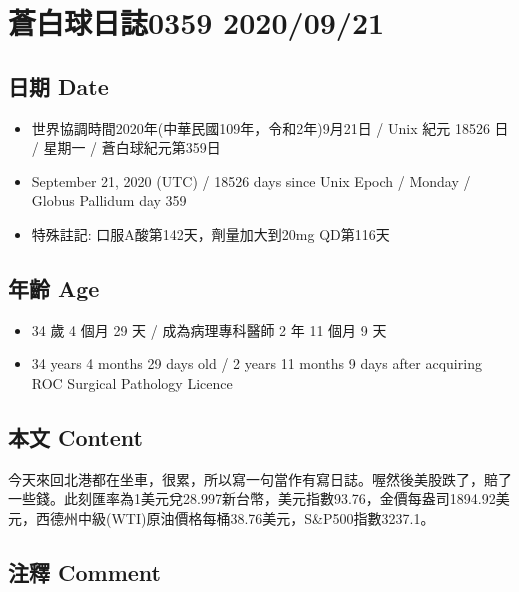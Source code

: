 \documentclass[a5paper, 11pt
]{book}
\providecommand{\tightlist}{%
  \setlength{\itemsep}{0pt}\setlength{\parskip}{0pt}}
\begin{document}
\hypertarget{ux84bcux767dux7403ux65e5ux8a8c0359-20200921}{%
\section{蒼白球日誌0359
2020/09/21}\label{ux84bcux767dux7403ux65e5ux8a8c0359-20200921}}

\hypertarget{ux65e5ux671f-date-20}{%
\subsection{日期 Date}\label{ux65e5ux671f-date-20}}

\begin{itemize}
\tightlist
\item
  世界協調時間2020年(中華民國109年，令和2年)9月21日 / Unix 紀元 18526 日
  / 星期一 / 蒼白球紀元第359日
\item
  September 21, 2020 (UTC) / 18526 days since Unix Epoch / Monday /
  Globus Pallidum day 359
\item
  特殊註記: 口服A酸第142天，劑量加大到20mg QD第116天
\end{itemize}

\hypertarget{ux5e74ux9f61-age-20}{%
\subsection{年齡 Age}\label{ux5e74ux9f61-age-20}}

\begin{itemize}
\tightlist
\item
  34 歲 4 個月 29 天 / 成為病理專科醫師 2 年 11 個月 9 天
\item
  34 years 4 months 29 days old / 2 years 11 months 9 days after
  acquiring ROC Surgical Pathology Licence
\end{itemize}

\hypertarget{ux672cux6587-content-20}{%
\subsection{本文 Content}\label{ux672cux6587-content-20}}

今天來回北港都在坐車，很累，所以寫一句當作有寫日誌。喔然後美股跌了，賠了一些錢。此刻匯率為1美元兌28.997新台幣，美元指數93.76，金價每盎司1894.92美元，西德州中級(WTI)原油價格每桶38.76美元，S\&P500指數3237.1。

\hypertarget{ux6ce8ux91cb-comment-20}{%
\subsection{注釋 Comment}\label{ux6ce8ux91cb-comment-20}}
\end{document}
